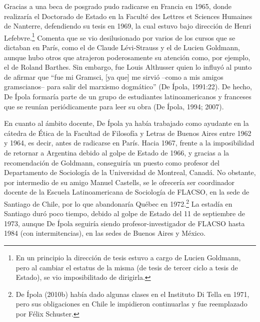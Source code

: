 Gracias a una beca de posgrado pudo radicarse en Francia en 1965, donde realizaría el Doctorado de Estado en la Faculté des Lettres et Sciences Humaines de Nanterre, defendiendo su tesis en 1969, la cual estuvo bajo dirección de Henri Lefebvre.\footnote{En un principio la dirección de tesis estuvo a cargo de Lucien Goldmann, pero al cambiar el estatus de la misma (de tesis de tercer ciclo a tesis de Estado), se vio imposibilitado de dirigirla.} Comenta que se vio desilusionado por varios de los cursos que se dictaban en París, como el de Claude Lévi-Strauss y el de Lucien Goldmann, aunque hubo otros que atrajeron poderosamente su atención como, por ejemplo, el de Roland Barthes. Sin embargo, fue Louis Althusser quien lo influyó al punto de afirmar que ``fue mi Gramsci, {[}ya que{]} me sirvió --como a mis amigos gramscianos-- para salir del marxismo dogmático'' (De Ípola, 1991:22). De hecho, De Ípola formaría parte de un grupo de estudiantes latinoamericanos y franceses que se reunían periódicamente para leer su obra (De Ípola, 1994; 2007).

En cuanto al ámbito docente, De Ípola ya había trabajado como ayudante en la cátedra de Ética de la Facultad de Filosofía y Letras de Buenos Aires entre 1962 y 1964, es decir, antes de radicarse en París. Hacia 1967, frente a la imposibilidad de retornar a Argentina debido al golpe de Estado de 1966, y gracias a la recomendación de Goldmann, conseguiría un puesto como profesor del Departamento de Sociología de la Universidad de Montreal, Canadá. No obstante, por intermedio de su amigo Manuel Castells, se le ofrecería ser coordinador docente de la Escuela Latinoamericana de Sociología de FLACSO, en la sede de Santiago de Chile, por lo que abandonaría Québec en 1972.\footnote{De Ípola (2010b) había dado algunas clases en el Instituto Di Tella en 1971, pero sus obligaciones en Chile le impidieron continuarlas y fue reemplazado por Félix Schuster.} La estadía en Santiago duró poco tiempo, debido al golpe de Estado del 11 de septiembre de 1973, aunque De Ípola seguiría siendo profesor-investigador de FLACSO hasta 1984 (con intermitencias), en las sedes de Buenos Aires y México.

